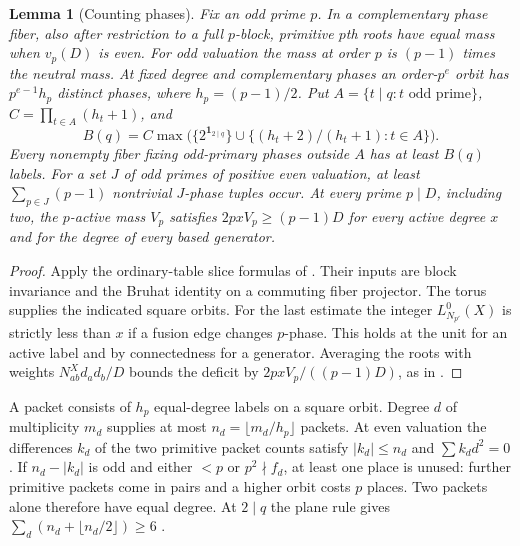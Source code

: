 \documentclass[11pt]{amsart}
\numberwithin{equation}{section}
\newtheorem{lemma}[theorem]{Lemma}
\theoremstyle{definition}
\theoremstyle{plain}
\begin{document}
\begin{lemma}[Counting phases]\label{block:moments}
Fix an odd prime $p$. In a complementary phase fiber, also after
restriction to a full $p$-block, primitive $p$th roots have equal
mass when $v_p(D)$ is even. For odd valuation the mass at order $p$ is
$(p-1)$ times the neutral mass. At fixed degree and complementary
phases an order-$p^e$ orbit has $p^{e-1}h_p$ distinct phases, where
$h_p=(p-1)/2$.
Put $A=\{t\mid q:t\text{ odd prime}\}$,
$C=\prod_{t\in A}(h_t+1)$, and
\[
 B(q)= C\max\bigl(\{2^{\mathbf1_{2\mid q}}\}
               \cup\{(h_t+2)/(h_t+1):t\in A\}\bigr).
\]
Every nonempty fiber fixing odd-primary phases outside $A$ has
at least $B(q)$ labels. For a set $J$ of odd primes of positive even
valuation, at least $\sum_{p\in J}(p-1)$ nontrivial $J$-phase tuples
occur. At every prime $p\mid D$, including two, the $p$-active mass $V_p$ satisfies
$2pxV_p\ge(p-1)D$ for every active degree $x$ and for the degree
of every based generator.
\end{lemma}
\begin{proof}
Apply the ordinary-table slice formulas of
\cite[Propositions~3.9, 19.1, 19.8 and \S19.2]{BDPcore}. Their
inputs are block invariance and the Bruhat identity on a commuting
fiber projector. The torus supplies the indicated square orbits. For
the last estimate the integer $L^0_{N_{p'}}(X)$ is strictly less
than $x$ if a fusion edge changes $p$-phase. This holds at the unit
for an active label and by connectedness for a generator. Averaging
the roots with weights $N_{ab}^X d_a d_b/D$ bounds the deficit by
$2pxV_p/((p-1)D)$, as in \cite[Proposition~3.8]{BDPcore}.
\end{proof}
A packet consists of $h_p$ equal-degree labels on a square orbit.
Degree $d$ of multiplicity $m_d$ supplies at most $n_d=\lfloor m_d/h_p\rfloor$
packets. At even valuation the differences $k_d$ of the two primitive
packet counts satisfy $|k_d|\le n_d$ and $\sum k_dd^2=0$. If
$n_d-|k_d|$ is odd and either $<p$ or $p^2\nmid f_d$, at least
one place is unused: further primitive packets come in pairs and
a higher orbit costs $p$ places. Two packets alone therefore have
equal degree. At $2\mid q$ the plane rule gives
$\sum_d(n_d+\lfloor n_d/2\rfloor)\ge6$
\cite[Lemma~19.6]{BDPcore}.
\end{document}

